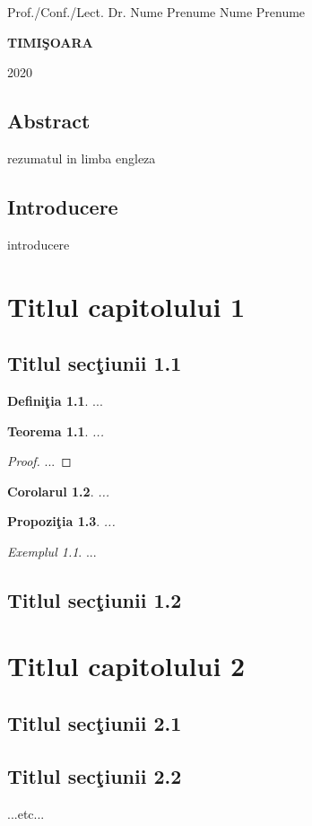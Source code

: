 \documentclass[12pt,a4paper]{report}
\newtheorem{thm}{Teorema}[section]
\newtheorem{cor}[thm]{Corolarul}
\newtheorem{prop}[thm]{Propozi\c tia}
\theoremstyle{definition}
\newtheorem{defn}{Defini\c tia}[section]
\theoremstyle{remark}
\newtheorem{exmp}{Exemplul}[section]
\begin{document}
{\large{}

\noindent Prof./Conf./Lect. Dr. Nume Prenume \hfill Nume Prenume}

\vfill
\begin{center}
{\bf TIMI\c SOARA

2020}
\end{center}
\newpage
\normalsize{}
\section*{Abstract}
rezumatul in limba engleza
\tableofcontents
\newpage
\section*{Introducere}

introducere
\chapter{Titlul capitolului 1}
\section{Titlul sec\c tiunii 1.1}
\begin{defn} ...
\end{defn}
\begin{thm} ...
\end{thm}
\begin{proof} ...
\end{proof}
\begin{cor} ...
\end{cor}
\begin{prop} ...
\end{prop}
\begin{exmp} ...
\end{exmp}

\section{Titlul sec\c tiunii 1.2}
\cite{Bersani}
\chapter{Titlul capitolului 2}
\section{Titlul sec\c tiunii 2.1}
\section{Titlul sec\c tiunii 2.2}
...etc...



\end{document}
